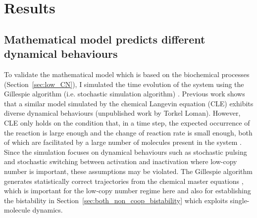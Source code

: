 \chapter{Results}

\ifpdf
    \graphicspath{{Chapter3/Figs/Raster/}{Chapter3/Figs/PDF/}{Chapter3/Figs/}{Figs}}
\else
    \graphicspath{{Chapter3/Figs/Vector/}{Chapter3/Figs/}{Figs}}
\fi

\section{Mathematical model predicts different dynamical behaviours}
\label{sec:general_diff_behaviours}

To validate the mathematical model which is based on the biochemical processes
(Section~\ref{sec:low_CN}), I simulated the time evolution of the system 
using the Gillespie algorithm (i.e. stochastic simulation algorithm) 
\cite{gillespie77}.
Previous work shows that a similar model simulated by the chemical Langevin 
equation (CLE) exhibits diverse dynamical behaviours (unpublished work by
Torkel Loman).
However, CLE only holds on the condition that, in a time step,
the expected occurrence of the reaction is large enough and the change
of reaction rate is small enough, both of which are facilitated by a large
number of molecules present in the system \cite{gillespie00}.
Since the simulation focuses on dynamical behaviours such as stochastic pulsing
and stochastic switching between activation and inactivation
where low-copy number is important,
these assumptions may be violated.
The Gillespie algorithm generates statistically correct trajectories
from the chemical master equations \cite{gillespie77}, 
which is important for the low-copy number
regime here and also for establishing the bistability
in Section~\ref{sec:both_non_coop_bistability} which exploits
single-molecule dynamics.

